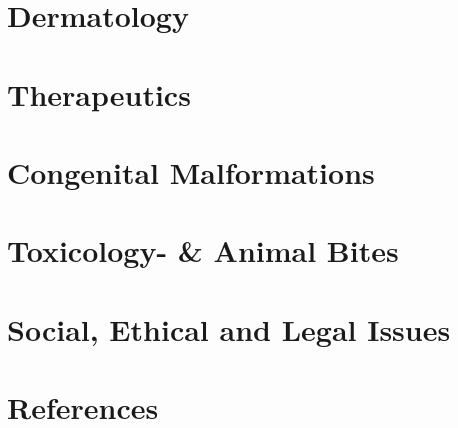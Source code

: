 \documentclass[
  letterpaper,
  DIV=11,
  numbers=noendperiod]{scrreprt}
\newlength{\cslhangindent}
\newlength{\cslentryspacingunit} %
\newenvironment{CSLReferences}[2] %
 {%
  \setlength{\parindent}{0pt}
  \ifodd #1
  \let\oldpar\par
  \def\par{\hangindent=\cslhangindent\oldpar}
  \fi
  \setlength{\parskip}{#2\cslentryspacingunit}
 }%
 {}
\begin{document}

\hypertarget{dermatology}{%
\chapter{Dermatology}\label{dermatology}}


\hypertarget{therapeutics}{%
\chapter{Therapeutics}\label{therapeutics}}


\hypertarget{congenital-malformations}{%
\chapter{Congenital Malformations}\label{congenital-malformations}}


\hypertarget{toxicology--animal-bites}{%
\chapter{Toxicology- \& Animal Bites}\label{toxicology--animal-bites}}


\hypertarget{social-ethical-and-legal-issues}{%
\chapter{Social, Ethical and Legal
Issues}\label{social-ethical-and-legal-issues}}


\hypertarget{references}{%
\chapter*{References}\label{references}}


\hypertarget{refs}{}
\begin{CSLReferences}{0}{0}
\end{CSLReferences}
\end{document}
